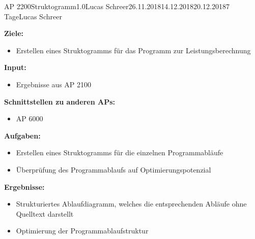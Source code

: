 \begin{appendix}
\clearpage
\begin{wpd}{AP 2200}{Struktogramm}{1.0}{Lucas Schreer}{26.11.2018}{14.12.2018}{20.12.2018}{7 Tage}{Lucas Schreer}
    {
    \textbf{Ziele:}
    \begin{itemize}
        \item Erstellen eines Struktogramms für das Programm zur Leistungsberechnung
    \end{itemize}
    \textbf{Input:}
    \begin{itemize}
        \item Ergebnisse aus AP 2100
    \end{itemize}
    \textbf{Schnittstellen zu anderen APs:}
    \begin{itemize}
        \item AP 6000
    \end{itemize}
    \textbf{Aufgaben:}
    \begin{itemize}
        \item Erstellen eines Struktogramms für die einzelnen Programmabläufe
        \item Überprüfung des Programmablaufs auf Optimierungspotenzial
    \end{itemize}
    \textbf{Ergebnisse:}
    \begin{itemize}
        \item Strukturiertes Ablaufdiagramm, welches die entsprechenden Abläufe ohne Quelltext darstellt
        \item Optimierung der Programmablaufstruktur
    \end{itemize}
    }
\end{wpd}



\end{appendix}
